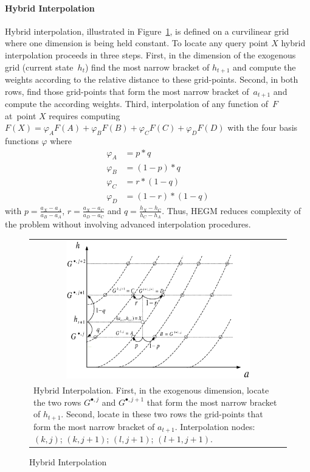 \documentclass[a4paper,12pt]{article}%
\begin{document}
\paragraph{Hybrid Interpolation}

Hybrid interpolation, illustrated in Figure~\ref{Hybrid interpolation}, is defined on a curvilinear grid where one dimension is being held constant. To locate any query point $X$ hybrid interpolation proceeds in three steps. First, in the dimension of the exogenous grid (current state~$h_{t}$) find the most narrow bracket of $h_{t+1}$ and compute the weights according to the relative distance to these grid-points. Second, in both rows, find those grid-points that form the most narrow bracket of~$a_{t+1}$ and compute the according weights. Third, interpolation of any function of~$F$ at\ point $X$ requires computing $F\left(  X\right)  =\varphi_{A}F(A)+\varphi_{B}F(B)+\varphi_{C}F(C)+\varphi_{D}F(D)$ with the four basis functions $\varphi$ where
\begin{align*}
\varphi_{A}  &  =p\ast q\\
\varphi_{B}  &  =\left(  1-p\right)  \ast q\\
\varphi_{C}  &  =r\ast\left(  1-q\right) \\
\varphi_{D}  &  =\left(  1-r\right)  \ast\left(  1-q\right)
\end{align*}
with $p=\frac{a_{X}-a_{A}}{a_{B}-a_{A}}$, $r=\frac{a_{X}-a_{C}}{a_{D}-a_{C}}$ and $q=\frac{h_{X}-h_{C}}{h_{C}-h_{A}}$. Thus, HEGM reduces complexity of the problem without involving advanced interpolation procedures.

\begin{figure}[htb] \centering
\caption{Hybrid Interpolation}
\begin{tabular}
[c]{p{15cm}}
\\
\multicolumn{1}{c}{{\includegraphics[height=6.0cm, width=9.0cm]{Abbildungen/hybrid_3.eps}}}\\
{\footnotesize Hybrid Interpolation. First, in the exogenous dimension, locate the two rows $G^{\bullet,j}$ and $G^{\bullet,j+1}$ that form the most narrow bracket of $h_{t+1}$. Second, locate in these two rows the grid-points that form the most narrow bracket of $a_{t+1}$. Interpolation nodes: $(k,j)$; $(k,j+1)$; $(l,j+1)$; $(l+1,j+1)$.}
\end{tabular}
\label{Hybrid interpolation}
\end{figure}
\end{document}
